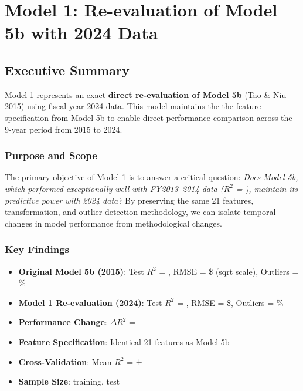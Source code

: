 \chapter{Model 1: Re-evaluation of Model 5b with 2024 Data}\label{ch:model1}




\def\themodel{1}

\section{Executive Summary}

Model 1 represents an exact \textbf{direct re-evaluation of Model 5b} (Tao \& Niu 2015) using fiscal year 2024 data. This model maintains the the feature specification from Model 5b to enable direct performance comparison across the 9-year period from 2015 to 2024.  

\subsection{Purpose and Scope}

The primary objective of Model 1 is to answer a critical question: \textit{Does Model 5b, which performed exceptionally well with FY2013--2014 data ($R^2$ = \ModelOneFiveBRSquaredTwoThousandFifteen), maintain its predictive power with 2024 data?} By preserving the same 21 features, transformation, and outlier detection methodology, we can isolate temporal changes in model performance from methodological changes.

\subsection{Key Findings}

\begin{itemize}
    \item \textbf{Original Model 5b (2015)}: Test $R^2$ = \ModelOneFiveBRSquaredTwoThousandFifteen, RMSE = \$\ModelOneFiveBRMSETwoThousandFifteen{} (sqrt scale), Outliers = \ModelOneFiveBOutlierPctTwoThousandFifteen\%
    \item \textbf{Model 1 Re-evaluation (2024)}: Test $R^2$ = \MRSquaredTest, RMSE = \$\MRMSETest, Outliers = \MOutlierPct\%
    \item \textbf{Performance Change}: $\Delta$$R^2$ = \ModelOneRSquaredDeltaFromTwoThousandFifteen
    \item \textbf{Feature Specification}: Identical 21 features as Model 5b
    \item \textbf{Cross-Validation}: Mean $R^2$ = \MCVMean{} ± \MCVStd
    \item \textbf{Sample Size}: \MTrainingSamples{} training, \MTestSamples{} test
\end{itemize}

